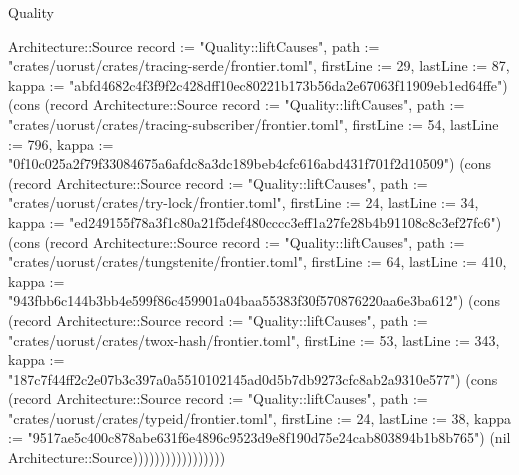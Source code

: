 \begin{lexlean}{Quality}
\begin{semanticmodule}
{Architecture::Source {record := "Quality::liftCauses", path := "crates/uorust/crates/tracing-serde/frontier.toml", firstLine := 29, lastLine := 87, kappa := "abfd4682c4f3f9f2c428dff10ec80221b173b56da2e67063f11909eb1ed64ffe"}) (cons (record Architecture::Source {record := "Quality::liftCauses", path := "crates/uorust/crates/tracing-subscriber/frontier.toml", firstLine := 54, lastLine := 796, kappa := "0f10c025a2f79f33084675a6afdc8a3dc189beb4cfc616abd431f701f2d10509"}) (cons (record Architecture::Source {record := "Quality::liftCauses", path := "crates/uorust/crates/try-lock/frontier.toml", firstLine := 24, lastLine := 34, kappa := "ed249155f78a3f1c80a21f5def480cccc3eff1a27fe28b4b91108c8c3ef27fc6"}) (cons (record Architecture::Source {record := "Quality::liftCauses", path := "crates/uorust/crates/tungstenite/frontier.toml", firstLine := 64, lastLine := 410, kappa := "943fbb6c144b3bb4e599f86c459901a04baa55383f30f570876220aa6e3ba612"}) (cons (record Architecture::Source {record := "Quality::liftCauses", path := "crates/uorust/crates/twox-hash/frontier.toml", firstLine := 53, lastLine := 343, kappa := "187c7f44ff2c2e07b3c397a0a5510102145ad0d5b7db9273cfc8ab2a9310e577"}) (cons (record Architecture::Source {record := "Quality::liftCauses", path := "crates/uorust/crates/typeid/frontier.toml", firstLine := 24, lastLine := 38, kappa := "9517ae5c400c878abe631f6e4896c9523d9e8f190d75e24cab803894b1b8b765"}) (nil Architecture::Source)))))))))))))))))
}


\end{semanticmodule}
\end{lexlean}

